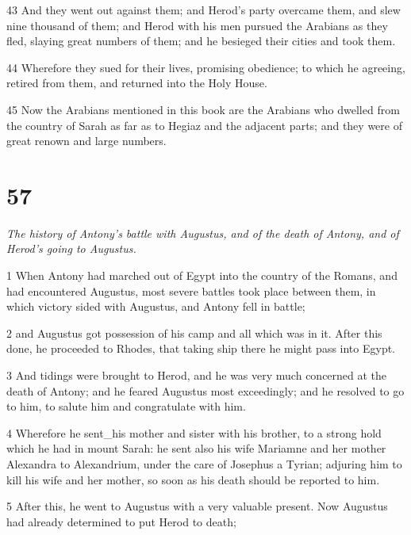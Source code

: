 \par 43 And they went out against them; and Herod’s party overcame them, and slew nine thousand of them; and Herod with his men pursued the Arabians as they fled, slaying great numbers of them; and he besieged their cities and took them. 

\par 44 Wherefore they sued for their lives, promising obedience; to which he agreeing, retired from them, and returned into the Holy House. 

\par 45 Now the Arabians mentioned in this book are the Arabians who dwelled from the country of Sarah as far as to Hegiaz and the adjacent parts; and they were of great renown and large numbers. 


\chapter{57}

\par \textit{The history of Antony's battle with Augustus, and of the death of Antony, and of Herod’s going to Augustus.}

\par 1 When Antony had marched out of Egypt into the country of the Romans, and had encountered Augustus, most severe battles took place between them, in which victory sided with Augustus, and Antony fell in battle; 

\par 2 and Augustus got possession of his camp and all which was in it. After this done, he proceeded to Rhodes, that taking ship there he might pass into Egypt. 

\par 3 And tidings were brought to Herod, and he was very much concerned at the death of Antony; and he feared Augustus most exceedingly; and he resolved to go to him, to salute him and congratulate with him. 

\par 4 Wherefore he sent_his mother and sister with his brother, to a strong hold which he had in mount Sarah: he sent also his wife Mariamne and her mother Alexandra to Alexandrium, under the care of Josephus a Tyrian; adjuring him to kill his wife and her mother, so soon as his death should be reported to him. 

\par 5 After this, he went to Augustus with a very valuable present. Now Augustus had already determined to put Herod to death; 

